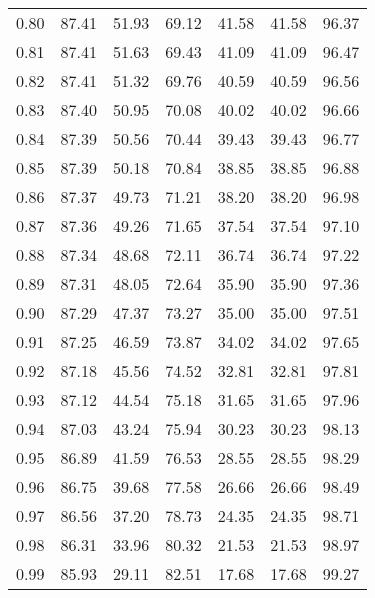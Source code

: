 \begin{tabular}{|c|c|c|c|c|c|c|}
      0.80 &     87.41 &     51.93 &      69.12 &   41.58 &      41.58 &         96.37 \\
      0.81 &     87.41 &     51.63 &      69.43 &   41.09 &      41.09 &         96.47 \\
      0.82 &     87.41 &     51.32 &      69.76 &   40.59 &      40.59 &         96.56 \\
      0.83 &     87.40 &     50.95 &      70.08 &   40.02 &      40.02 &         96.66 \\
      0.84 &     87.39 &     50.56 &      70.44 &   39.43 &      39.43 &         96.77 \\
      0.85 &     87.39 &     50.18 &      70.84 &   38.85 &      38.85 &         96.88 \\
      0.86 &     87.37 &     49.73 &      71.21 &   38.20 &      38.20 &         96.98 \\
      0.87 &     87.36 &     49.26 &      71.65 &   37.54 &      37.54 &         97.10 \\
      0.88 &     87.34 &     48.68 &      72.11 &   36.74 &      36.74 &         97.22 \\
      0.89 &     87.31 &     48.05 &      72.64 &   35.90 &      35.90 &         97.36 \\
      0.90 &     87.29 &     47.37 &      73.27 &   35.00 &      35.00 &         97.51 \\
      0.91 &     87.25 &     46.59 &      73.87 &   34.02 &      34.02 &         97.65 \\
      0.92 &     87.18 &     45.56 &      74.52 &   32.81 &      32.81 &         97.81 \\
      0.93 &     87.12 &     44.54 &      75.18 &   31.65 &      31.65 &         97.96 \\
      0.94 &     87.03 &     43.24 &      75.94 &   30.23 &      30.23 &         98.13 \\
      0.95 &     86.89 &     41.59 &      76.53 &   28.55 &      28.55 &         98.29 \\
      0.96 &     86.75 &     39.68 &      77.58 &   26.66 &      26.66 &         98.49 \\
      0.97 &     86.56 &     37.20 &      78.73 &   24.35 &      24.35 &         98.71 \\
      0.98 &     86.31 &     33.96 &      80.32 &   21.53 &      21.53 &         98.97 \\
      0.99 &     85.93 &     29.11 &      82.51 &   17.68 &      17.68 &         99.27 \\
\bottomrule
\end{tabular}
